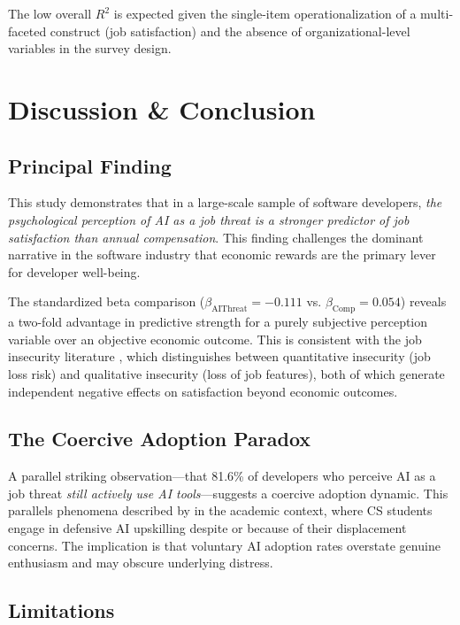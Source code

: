 \documentclass[11pt]{article}
\begin{document}
The low overall $R^2$ is expected given the single-item operationalization of a
multi-faceted construct (job satisfaction) and the absence of organizational-level
variables in the survey design.

\section{Discussion \& Conclusion}

\subsection{Principal Finding}

This study demonstrates that in a large-scale sample of software developers, \emph{the
psychological perception of AI as a job threat is a stronger predictor of job satisfaction
than annual compensation}. This finding challenges the dominant narrative in the software
industry that economic rewards are the primary lever for developer well-being.

The standardized beta comparison ($\beta_{\text{AIThreat}} = -0.111$ vs.
$\beta_{\text{Comp}} = 0.054$) reveals a two-fold advantage in predictive strength for
a purely subjective perception variable over an objective economic outcome. This is
consistent with the job insecurity literature \citep{ghosh2024, sadeghi2024}, which
distinguishes between quantitative insecurity (job loss risk) and qualitative insecurity
(loss of job features), both of which generate independent negative effects on
satisfaction beyond economic outcomes.

\subsection{The Coercive Adoption Paradox}

A parallel striking observation---that 81.6\% of developers who perceive AI as a job
threat \emph{still actively use AI tools}---suggests a coercive adoption dynamic. This
parallels phenomena described by \citet{farooqi2026} in the academic context, where CS
students engage in defensive AI upskilling despite or because of their displacement
concerns. The implication is that voluntary AI adoption rates overstate genuine enthusiasm
and may obscure underlying distress.

\subsection{Limitations}
\end{document}
